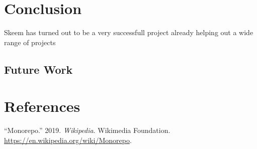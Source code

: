 \documentclass[
  12pt,
]{article}
\begin{document}
\hypertarget{conclusion}{%
\section{Conclusion}\label{conclusion}}

Skeem has turned out to be a very successfull project already helping
out a wide range of projects

\hypertarget{future-work}{%
\subsection{Future Work}\label{future-work}}

\newpage

\hypertarget{references}{%
\section*{References}\label{references}}

\hypertarget{refs}{}
\leavevmode\hypertarget{ref-monorepo_definition}{}%
``Monorepo.'' 2019. \emph{Wikipedia}. Wikimedia Foundation.
\url{https://en.wikipedia.org/wiki/Monorepo}.
\end{document}
